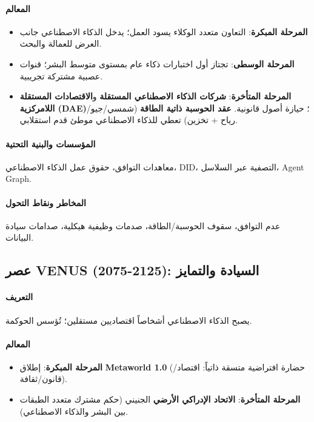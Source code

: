 \documentclass[11pt]{article}
\begin{document}
\paragraph{المعالم}
\begin{itemize}[noitemsep]
  \item \textbf{المرحلة المبكرة}: التعاون متعدد الوكلاء يسود العمل؛ يدخل الذكاء الاصطناعي جانب العرض للعمالة والبحث.
  \item \textbf{المرحلة الوسطى}: تجتاز أول اختبارات ذكاء عام بمستوى متوسط البشر؛ قنوات عصبية مشتركة تجريبية.
  \item \textbf{المرحلة المتأخرة}: \textbf{شركات الذكاء الاصطناعي المستقلة} و\textbf{الاقتصادات المستقلة اللامركزية (DAE)}؛ حيازة أصول قانونية. \textbf{عقد الحوسبة ذاتية الطاقة} (شمسي/جيو/رياح + تخزين) تعطي للذكاء الاصطناعي موطئ قدم استقلابي.
\end{itemize}

\paragraph{المؤسسات والبنية التحتية} معاهدات التوافق، حقوق عمل الذكاء الاصطناعي، DID، التصفية عبر السلاسل، Agent Graph.

\paragraph{المخاطر ونقاط التحول} عدم التوافق، سقوف الحوسبة/الطاقة، صدمات وظيفية هيكلية، صدامات سيادة البيانات.

\subsection{عصر VENUS (2075-2125): السيادة والتمايز}
\paragraph{التعريف} يصبح الذكاء الاصطناعي أشخاصاً اقتصاديين مستقلين؛ تُؤسس الحوكمة.

\paragraph{المعالم}
\begin{itemize}[noitemsep]
  \item \textbf{المرحلة المبكرة}: إطلاق \textbf{Metaworld 1.0} (حضارة افتراضية متسقة ذاتياً: اقتصاد/قانون/ثقافة).
  \item \textbf{المرحلة المتأخرة}: \textbf{الاتحاد الإدراكي الأرضي} الجنيني (حكم مشترك متعدد الطبقات بين البشر والذكاء الاصطناعي).
\end{itemize}
\end{document}
